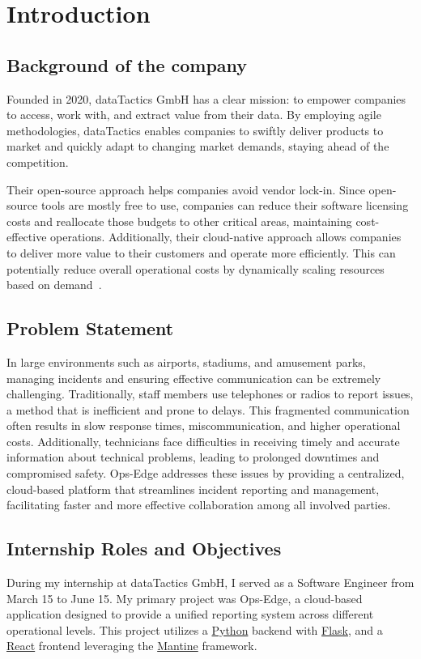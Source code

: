 \chapter{Introduction}
\label{ch:intro}

\section{Background of the company}
\label{sec:intro:background}
Founded in 2020, dataTactics GmbH has a clear mission: to empower companies to access, work with, and extract value from their data. By employing agile methodologies, dataTactics enables companies to swiftly deliver products to market and quickly adapt to changing market demands, staying ahead of the competition.

Their open-source approach helps companies avoid vendor lock-in. Since open-source tools are mostly free to use, companies can reduce their software licensing costs and reallocate those budgets to other critical areas, maintaining cost-effective operations. Additionally, their cloud-native approach allows companies to deliver more value to their customers and operate more efficiently. This can potentially reduce overall operational costs by dynamically scaling resources based on demand~\cite{gmbh_datatactics_nodate}.

%
%
\section{Problem Statement}
\label{sec:intro:problem_statement}
In large environments such as airports, stadiums, and amusement parks, managing incidents and ensuring effective communication can be extremely challenging. Traditionally, staff members use telephones or radios to report issues, a method that is inefficient and prone to delays. This fragmented communication often results in slow response times, miscommunication, and higher operational costs. Additionally, technicians face difficulties in receiving timely and accurate information about technical problems, leading to prolonged downtimes and compromised safety. Ops-Edge addresses these issues by providing a centralized, cloud-based platform that streamlines incident reporting and management, facilitating faster and more effective collaboration among all involved parties.

%
%
\section{Internship Roles and Objectives}
\label{sec:intro:internship_roles_and_objectives}
During my internship at dataTactics GmbH, I served as a Software Engineer from March 15 to June 15. My primary project was Ops-Edge, a cloud-based application designed to provide a unified reporting system across different operational levels. This project utilizes a \href{https://www.python.org/}{Python} backend with \href{https://flask.palletsprojects.com/en/3.0.x/}{Flask}, and a \href{https://react.dev/}{React} frontend leveraging the \href{https://mantine.dev/}{Mantine} framework.

